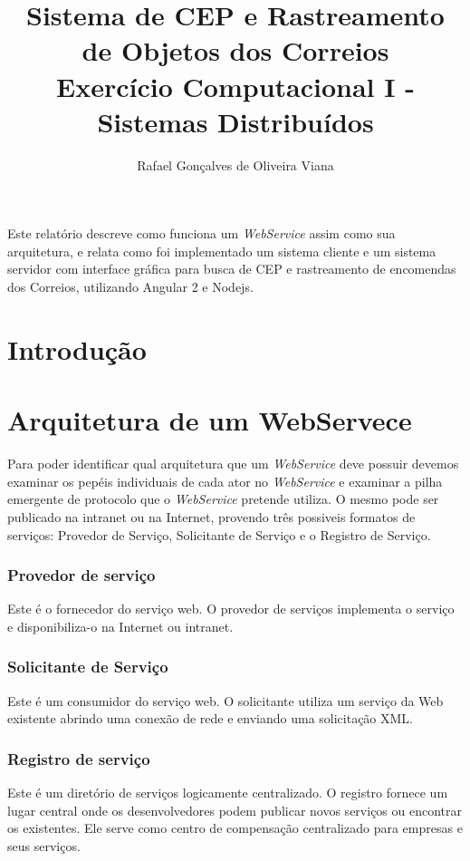 \documentclass[12pt]{article}
\title{Sistema de CEP e Rastreamento de Objetos dos Correios  \\ Exercício Computacional I - Sistemas Distribuídos}
\author{Rafael Gonçalves de Oliveira Viana\inst{1} }
\begin{document}
 

\maketitle

     
\begin{resumo} 	
  Este relatório descreve como funciona um \textit{WebService} assim como sua arquitetura, e relata como foi implementado um sistema cliente e um sistema servidor com interface gráfica para busca de CEP e rastreamento de encomendas dos Correios, utilizando Angular 2 e Nodejs.
\end{resumo}



\section{Introdução}

\section{Arquitetura de um WebServece}
Para poder identificar qual arquitetura que um \textit{WebService} deve possuir devemos examinar os pepéis individuais de cada ator no \textit{WebService} e examinar a pilha emergente de protocolo que o \textit{WebService} pretende utiliza.
O mesmo pode ser publicado na intranet ou na Internet, provendo três possiveis formatos de serviços: Provedor de Serviço, Solicitante de Serviço e o Registro de Serviço.

\subsubsection {Provedor de serviço}
Este é o fornecedor do serviço web. O provedor de serviços implementa o serviço e disponibiliza-o na Internet ou intranet.

\subsubsection {Solicitante de Serviço}
Este é um consumidor do serviço web. O solicitante utiliza um serviço da Web existente abrindo uma conexão de rede e enviando uma solicitação XML.

\subsubsection {Registro de serviço}
Este é um diretório de serviços logicamente centralizado. O registro fornece um lugar central onde os desenvolvedores podem publicar novos serviços ou encontrar os existentes. Ele serve como centro de compensação centralizado para empresas e seus serviços.
\end{document}
